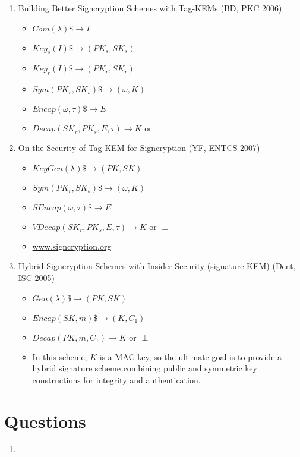 \documentclass[11pt, pdftex]{article}
\begin{document}
\begin{enumerate}
\item Building Better Signcryption Schemes with Tag-KEMs (BD, PKC 2006)
\begin{itemize}
\item $Com(\lambda) \$\rightarrow I$
\item $Key_s(I) \$\rightarrow (PK_s, SK_s)$
\item $Key_r(I) \$\rightarrow (PK_r, SK_r)$
\item $Sym(PK_r, SK_s) \$\rightarrow (\omega, K)$
\item $Encap(\omega, \tau) \$\rightarrow E$
\item $Decap(SK_r, PK_s, E, \tau) \rightarrow K \text{ or }\perp$
\end{itemize}

\item On the Security of Tag-KEM for Signcryption (YF, ENTCS 2007)
\begin{itemize}
\item $KeyGen(\lambda) \$\rightarrow (PK, SK)$
\item $Sym(PK_r, SK_s) \$\rightarrow (\omega, K)$
\item $SEncap(\omega, \tau) \$\rightarrow E$
\item $VDecap(SK_r, PK_s, E, \tau) \rightarrow K \text{ or }\perp$
\item \url{www.signcryption.org}
\end{itemize}

\item Hybrid Signcryption Schemes with Insider Security (signature KEM) (Dent, ISC 2005)
\begin{itemize}
\item $Gen(\lambda) \$\rightarrow (PK, SK)$
\item $Encap(SK, m) \$\rightarrow (K, C_1)$
\item $Decap(PK, m, C_1) \rightarrow K \text{ or }\perp$
\item In this scheme, $K$ is a MAC key, so the ultimate goal is to provide a hybrid signature scheme
combining public and symmetric key constructions for integrity and authentication.
\end{itemize}

\end{enumerate}



\section{Questions}
\begin{enumerate}
\item
\end{enumerate}
\end{document}
